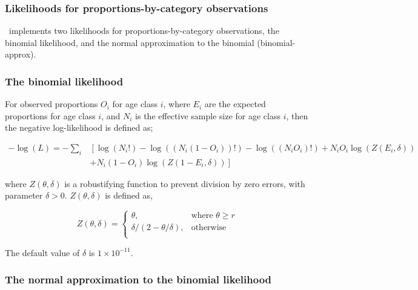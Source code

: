 {{{{{{\subsubsection{Likelihoods for proportions-by-category observations}

\SPM\ implements two likelihoods for proportions-by-category observations, the binomial likelihood, and the normal approximation to the binomial (binomial-approx). 

\subsubsection*{The binomial likelihood}

For observed proportions $O_i$ for age class $i$, where $E_i$ are the expected proportions for age class $i$, and $N_i$ is the effective sample size for age class $i$, then the negative log-likelihood is defined as;  

\begin{equation}
  \begin{split}
    -\log \left(L \right)= -\sum\limits_i & \left[ \right. \log \left(N_i! \right) - \log \left(\left(N_i \left(1 - O_i \right) \right)! \right) - \log \left(\left(N_i O_i \right)! \right) + N_i O_i \log \left(Z\left(E_i,\delta \right) \right) \\
    &+ N_i \left(1 - O_i \right)\log \left(Z\left(1 - E_i,\delta\right) \right) \left. \right]
  \end{split}
\end{equation}


where $Z \left(\theta,\delta \right)$ is a robustifying function to prevent division by zero errors, with parameter $\delta>0$. $Z \left(\theta,\delta \right)$ is defined as,

\begin{equation}
   Z \left(\theta,\delta \right) = \begin{cases}
	  \theta, & \text{where $\theta \ge r$} \\
	  \delta/\left( 2-\theta/\delta \right), & \text{otherwise} \\  
  \end{cases}
\end{equation}

The default value of $\delta$ is $1 \times 10^{-11}$.

\subsubsection*{The normal approximation to the binomial likelihood}

}}}}}}
